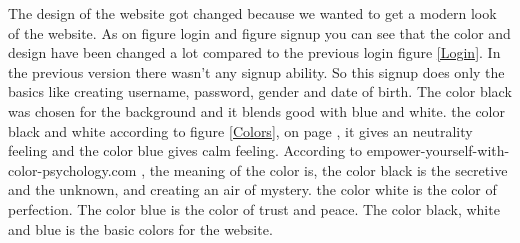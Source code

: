 The design of the website got changed because we wanted to get a modern look of the website. As on figure login and figure signup you can see that the color and design have been changed a lot compared to the previous login figure \ref{Login}. In the previous version there wasn’t any signup ability. So this signup does only the basics like creating username, password, gender and date of birth. The color black was chosen for the background and it blends good with blue and white. the color black and white according to figure \ref{Colors}, on page \pageref{Colors}, it gives an neutrality feeling and the color blue gives calm feeling. According to empower-yourself-with-color-psychology.com \cite{EmpowerColor}, the meaning of the color is,  the color black is the secretive and the unknown, and creating an air of mystery. the color white is the color of perfection. The color blue is the color of trust and peace. The color black, white and blue is the basic colors for the website.


